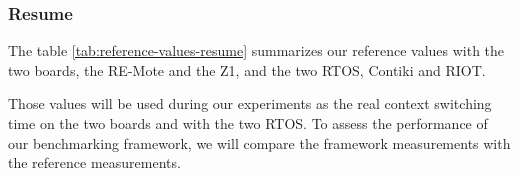\subsubsection{Resume}
The table \ref{tab:reference-values-resume} summarizes our reference values with the two boards, the RE-Mote and the Z1, and the two RTOS, Contiki and RIOT.



Those values will be used during our experiments as the real context switching time on the two boards and with the two RTOS.
To assess the performance of our benchmarking framework, we will compare the framework measurements with the reference measurements.